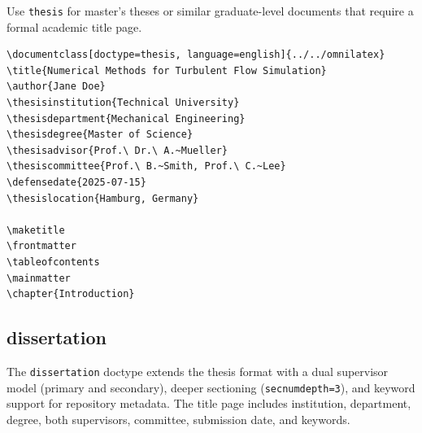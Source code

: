 Use \texttt{thesis} for master's theses or similar graduate-level documents
that require a formal academic title page.

\begin{verbatim}
\documentclass[doctype=thesis, language=english]{../../omnilatex}
\title{Numerical Methods for Turbulent Flow Simulation}
\author{Jane Doe}
\thesisinstitution{Technical University}
\thesisdepartment{Mechanical Engineering}
\thesisdegree{Master of Science}
\thesisadvisor{Prof.\ Dr.\ A.~Mueller}
\thesiscommittee{Prof.\ B.~Smith, Prof.\ C.~Lee}
\defensedate{2025-07-15}
\thesislocation{Hamburg, Germany}

\maketitle
\frontmatter
\tableofcontents
\mainmatter
\chapter{Introduction}

\end{verbatim}

\subsection{dissertation}

The \texttt{dissertation} doctype extends the thesis format with a dual
supervisor model (primary and secondary), deeper sectioning
(\texttt{secnumdepth=3}), and keyword support for repository metadata.  The
title page includes institution, department, degree, both supervisors,
committee, submission date, and keywords.

